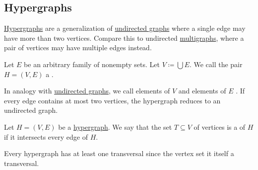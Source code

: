 \subsection{Hypergraphs}\label{subsec:hypergraphs}

\hyperref[def:hypergraph]{Hypergraphs} are a generalization of \hyperref[def:graph/directed]{undirected graphs} where a single edge may have more than two vertices. Compare this to undirected \hyperref[subsec:multigraphs]{multigraphs}, where a pair of vertices may have multiple edges instead.

\begin{definition}\label{def:hypergraph}
  Let \( E \) be an arbitrary family of nonempty sets. Let \( V \coloneqq \bigcup E \). We call the pair \( H = (V, E) \) a .

  In analogy with \hyperref[def:graph/undirected]{undirected graphs}, we call elements of \( V \)  and elements of \( E \) . If every edge contains at most two vertices, the hypergraph reduces to an undirected graph.
\end{definition}

\begin{definition}\label{def:hypergraph_transversal}
  Let \( H = (V, E) \) be a \hyperref[def:hypergraph]{hypergraph}. We say that the set \( T \subseteq V \) of vertices is a  of \( H \) if it intersects every edge of \( H \).
\end{definition}

\begin{example}\label{ex:hypergraph_vertex_set_is_transversal}
  Every hypergraph has at least one transversal since the vertex set it itself a transversal.
\end{example}

